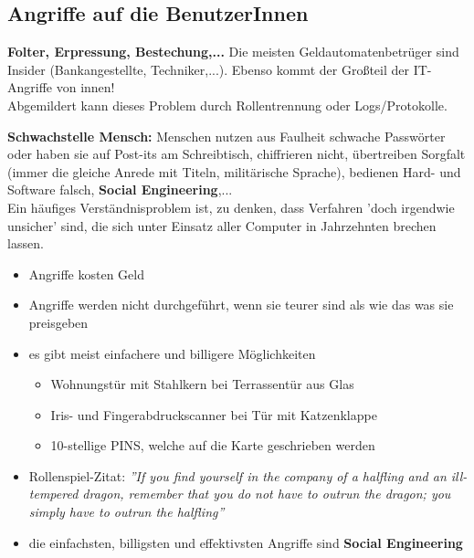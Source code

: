 \subsection{Angriffe auf die BenutzerInnen}
\textbf{Folter, Erpressung, Bestechung,...} Die meisten Geldautomatenbetrüger sind Insider (Bankangestellte, Techniker,...). Ebenso kommt der Großteil der IT-Angriffe von innen! \\
Abgemildert kann dieses Problem durch Rollentrennung oder Logs/Protokolle.

\textbf{Schwachstelle Mensch:} Menschen nutzen aus Faulheit schwache Passwörter oder haben sie auf Post-its am Schreibtisch, chiffrieren nicht, übertreiben Sorgfalt (immer die gleiche Anrede mit Titeln, militärische Sprache), bedienen Hard- und Software falsch, \textbf{Social Engineering},... \\

Ein häufiges Verständnisproblem ist, zu denken, dass Verfahren 'doch irgendwie unsicher' sind, die sich unter Einsatz aller Computer in Jahrzehnten brechen lassen.
\begin{itemize}
	\item Angriffe kosten Geld
	\item Angriffe werden nicht durchgeführt, wenn sie teurer sind als wie das was sie preisgeben
	\item es gibt meist einfachere und billigere Möglichkeiten
	\begin{itemize}
		\item Wohnungstür mit Stahlkern bei Terrassentür aus Glas
		\item Iris- und Fingerabdruckscanner bei Tür mit Katzenklappe
		\item 10-stellige PINS, welche auf die Karte geschrieben werden
	\end{itemize}
	\item Rollenspiel-Zitat: \textit{''If you find yourself in the company of a halfling and an ill-tempered dragon, remember that you do not have to outrun the dragon; you simply have to outrun the halfling''}
	\item die einfachsten, billigsten und effektivsten Angriffe sind \textbf{Social Engineering}
\end{itemize}

